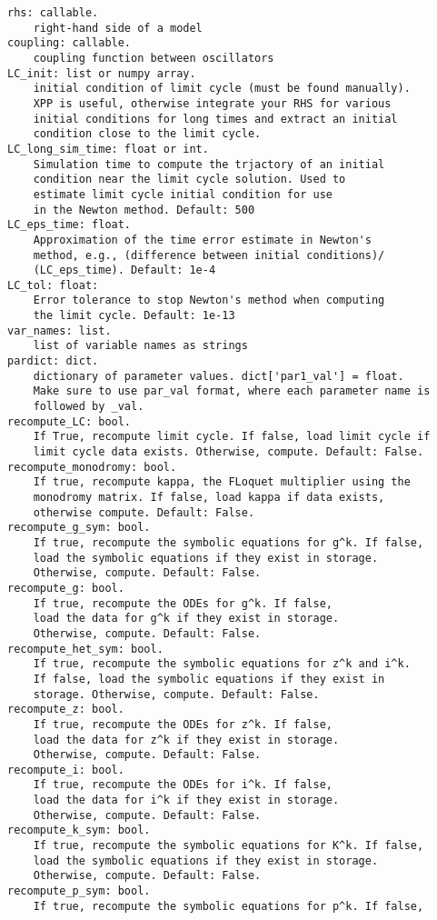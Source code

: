 \documentclass[english,a4paper,oneside]{article}
\begin{document}
\begin{verbatim}
rhs: callable.
    right-hand side of a model
coupling: callable.
    coupling function between oscillators
LC_init: list or numpy array.
    initial condition of limit cycle (must be found manually).
    XPP is useful, otherwise integrate your RHS for various
    initial conditions for long times and extract an initial
    condition close to the limit cycle.
LC_long_sim_time: float or int.
    Simulation time to compute the trjactory of an initial 
    condition near the limit cycle solution. Used to
    estimate limit cycle initial condition for use 
    in the Newton method. Default: 500
LC_eps_time: float.
    Approximation of the time error estimate in Newton's
    method, e.g., (difference between initial conditions)/
    (LC_eps_time). Default: 1e-4
LC_tol: float:
    Error tolerance to stop Newton's method when computing
    the limit cycle. Default: 1e-13
var_names: list.
    list of variable names as strings
pardict: dict.
    dictionary of parameter values. dict['par1_val'] = float.
    Make sure to use par_val format, where each parameter name is
    followed by _val.
recompute_LC: bool.
    If True, recompute limit cycle. If false, load limit cycle if
    limit cycle data exists. Otherwise, compute. Default: False.
recompute_monodromy: bool.
    If true, recompute kappa, the FLoquet multiplier using the
    monodromy matrix. If false, load kappa if data exists,
    otherwise compute. Default: False.
recompute_g_sym: bool.
    If true, recompute the symbolic equations for g^k. If false,
    load the symbolic equations if they exist in storage.
    Otherwise, compute. Default: False.
recompute_g: bool.
    If true, recompute the ODEs for g^k. If false,
    load the data for g^k if they exist in storage.
    Otherwise, compute. Default: False.
recompute_het_sym: bool.
    If true, recompute the symbolic equations for z^k and i^k.
    If false, load the symbolic equations if they exist in
    storage. Otherwise, compute. Default: False.
recompute_z: bool.
    If true, recompute the ODEs for z^k. If false,
    load the data for z^k if they exist in storage.
    Otherwise, compute. Default: False.
recompute_i: bool.
    If true, recompute the ODEs for i^k. If false,
    load the data for i^k if they exist in storage.
    Otherwise, compute. Default: False.
recompute_k_sym: bool.
    If true, recompute the symbolic equations for K^k. If false,
    load the symbolic equations if they exist in storage.
    Otherwise, compute. Default: False.
recompute_p_sym: bool.
    If true, recompute the symbolic equations for p^k. If false,

\end{verbatim}
\end{document}
